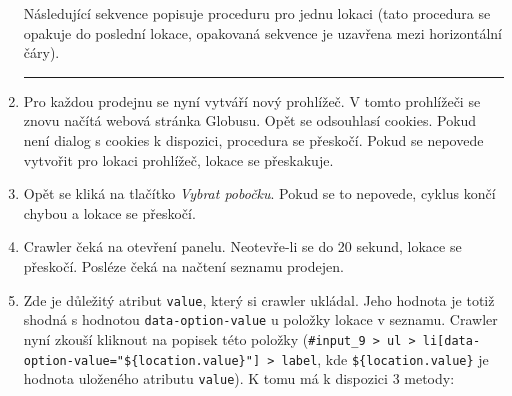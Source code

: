 \begin{enumerate}
        Následující sekvence popisuje proceduru pro jednu lokaci (tato
        procedura se opakuje do poslední lokace, opakovaná sekvence
        je uzavřena mezi horizontální čáry).
        \clearpage  \hrule
    \item Pro každou prodejnu se nyní vytváří nový prohlížeč. V tomto
        prohlížeči se znovu načítá webová stránka Globusu. Opět
        se odsouhlasí cookies. Pokud není dialog s cookies k dispozici,
        procedura se přeskočí. Pokud se nepovede vytvořit pro lokaci
        prohlížeč, lokace se přeskakuje.
    \item Opět se kliká na tlačítko \emph{Vybrat pobočku}. Pokud se to
        nepovede, cyklus končí chybou a lokace se přeskočí.
    \item Crawler čeká na otevření panelu. Neotevře-li se do 20 sekund,
        lokace se přeskočí. Posléze čeká na načtení seznamu prodejen.
    \item Zde je důležitý atribut \texttt{value}, který si crawler ukládal.
        Jeho hodnota je totiž shodná s hodnotou \texttt{data-option-value}
        u položky lokace v seznamu. Crawler nyní zkouší kliknout na popisek
        této položky (\texttt{\#input\_9 > ul >
        li[data-option-value="\$\{location.value\}"] > label},
        kde \texttt{\$\{location.value\}} je hodnota uloženého atributu
        \texttt{value}). K tomu má k dispozici 3 metody:
        

\end{enumerate}
